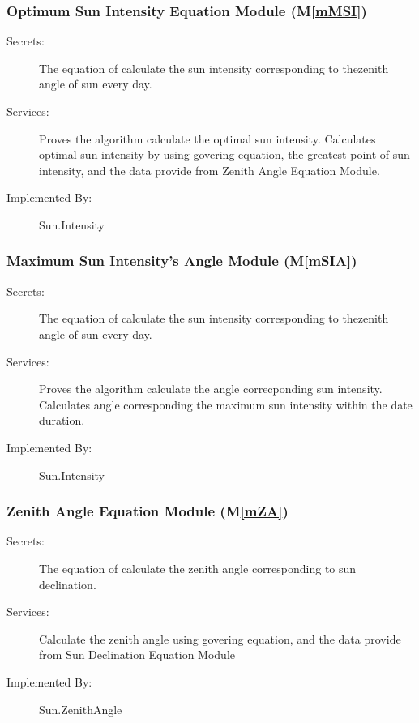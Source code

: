 \documentclass[12pt, titlepage]{article}
\newcommand{\mref}[1]{M\ref{#1}}
\begin{document}
\subsubsection{ Optimum Sun Intensity Equation Module (\mref{mMSI})}

\begin{description}
\item[Secrets:]The equation of calculate the sun intensity corresponding to
thezenith angle of sun every day.
\item[Services:] Proves the algorithm calculate the optimal sun intensity.
Calculates optimal sun intensity by using govering equation, the greatest point
of sun intensity, and the data provide from Zenith Angle Equation Module.

\item[Implemented By:] Sun.Intensity
\end{description}

\subsubsection{Maximum Sun Intensity's Angle Module (\mref{mSIA})}

\begin{description}
\item[Secrets:]The equation of calculate the sun intensity corresponding to
thezenith angle of sun every day.
\item[Services:] Proves the algorithm calculate the angle correcponding sun
intensity. Calculates angle corresponding the maximum sun intensity within the
date duration.

\item[Implemented By:] Sun.Intensity
\end{description}

\subsubsection{Zenith Angle Equation Module (\mref{mZA})}

\begin{description}
\item[Secrets:]The equation of calculate the zenith angle corresponding to sun 
declination.
\item[Services:] Calculate the zenith angle using govering equation, and the
data
provide from Sun Declination Equation Module
\item[Implemented By:] Sun.ZenithAngle
\end{description}
\end{document}
